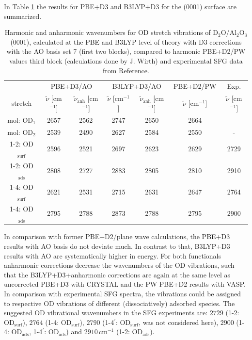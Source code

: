 \documentclass[11pt,DIV=13,BCOR=5mm,a4paper,headinclude]{scrbook}
\begin{document}
In Table \ref{tab:freqs_0001_crystal} the results for PBE+D3 and B3LYP+D3 for the (0001) surface are summarized.
\begin{table}[!h]
  \centering
  \caption{Harmonic and anharmonic wavenumbers for OD stretch vibrations of D$_2$O/Al$_2$O$_3$(0001), calculated at the PBE and B3LYP level of theory with D3 corrections with the AO basis set 7 (first two blocks), compared to harmonic PBE+D2/PW values third block (calculations done by J. Wirth\cite{Wirth2014thesis}) and experimental SFG data from Reference\cite{Wirth2014}.}
  \begin{tabular}{ccc|cc|c|c}
  \toprule
   & \multicolumn{2}{c}{PBE+D3/AO} & \multicolumn{2}{c}{B3LYP+D3/AO} &PBE+D2/PW&Exp.\cite{Wirth2014}\\
  stretch & $\tilde{\nu}$ [cm$^{-1}$] &$\tilde{\nu}_\textrm{anh}$ [cm$^{-1}$] &$\tilde{\nu}$ [cm$^{-1}$] & $\tilde{\nu}_\textrm{anh}$ [cm$^{-1}$]& $\tilde{\nu}$ [cm$^{-1}$]& $\tilde{\nu}$ [cm$^{-1}$]\\\midrule
  mol: OD$_{\textrm{1}}$    &2657 &2562 &2747 &2650 & 2664&-\\
  mol: OD$_{\textrm{2}}$    &2539 &2490 &2627 &2584 & 2550&-\\
  1-2: OD$_{\textrm{surf}}$ &2596 &2521 &2697 &2623 & 2629&2729\\%
  1-2: OD$_{\textrm{ads}}$  &2808 &2727 &2883 &2805 & 2810&2910\\%
  1-4: OD$_{\textrm{surf}}$ &2621 &2531 &2715 &2631 & 2647&2764\\%
  1-4: OD$_{\textrm{ads}}$  &2795 &2788 &2873 &2788 & 2795&2900\\%
  \bottomrule
    \end{tabular}
  \label{tab:freqs_0001_crystal}
\end{table}
In comparison with former PBE+D2/plane wave calculations, the PBE+D3 results with AO basis do not deviate much.
In contrast to that, B3LYP+D3 results with AO are systematically higher in energy.
For both functionals anharmonic corrections decrease the wavenumbers of the OD vibrations, such that the B3LYP+D3+anharmonic corrections are again at the same level as uncorrected PBE+D3 with CRYSTAL and the PW PBE+D2 results with VASP.
In comparison with experimental SFG spectra\cite{Wirth2014}, the vibrations could be assigned to respective OD vibrations of different (dissociatively) adsorbed species.
The suggested OD vibrational wavenumbers in the SFG experiments\cite{Wirth2014} are: $2729$ (1-2: OD$_{\textrm{surf}}$), $2764$ (1-4: OD$_{\textrm{surf}}$), $2790$ (1-4$^\prime$: OD$_{\textrm{surf}}$, was not considered here), $2900$ (1-4: OD$_{\textrm{ads}}$, 1-4$^\prime$: OD$_{\textrm{ads}}$) and $2910\,$cm$^{-1}$ (1-2: OD$_{\textrm{ads}}$).
\end{document}
